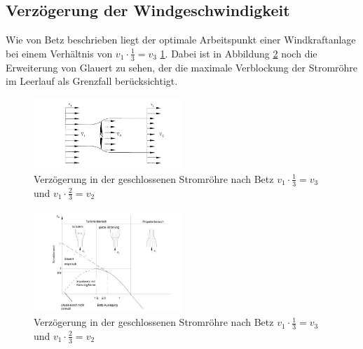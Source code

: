 \subsection{Verzögerung der Windgeschwindigkeit}
Wie von Betz beschrieben liegt der optimale Arbeitspunkt einer Windkraftanlage bei einem Verhältnis von $v_{1} \cdot \frac{1}{3}=v_{3}$  \ref{fig:Betz2905}. Dabei ist in Abbildung \ref{fig:Glauert} noch die Erweiterung von Glauert zu sehen, der die maximale Verblockung der Stromröhre im Leerlauf als Grenzfall berücksichtigt.
\begin{figure}[h!]
    \centering
    \includegraphics[width=0.5\textwidth]{Abbildungen/Betz.jpg}
    \caption{Verzögerung in der geschlossenen Stromröhre nach Betz $v_{1} \cdot \frac{1}{3}=v_{3}$ und  $v_{1} \cdot \frac{2}{3}=v_{2} $}
    \label{fig:Betz2905}
\end{figure}
\begin{figure}[h!]
    \centering
    \includegraphics[width=0.5\textwidth]{Abbildungen/Glauert.jpg}
    \caption{Verzögerung in der geschlossenen Stromröhre nach Betz $v_{1} \cdot \frac{1}{3}=v_{3}$ und  $v_{1} \cdot \frac{2}{3}=v_{2} $}
    \label{fig:Glauert}
\end{figure}
